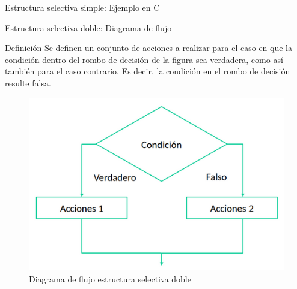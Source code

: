 \documentclass[xcolor=pdftex,table,11pt]{beamer}
\begin{document}
\begin{frame}{Estructura selectiva simple: Ejemplo en C}
\codesetstylefrombeamer
{}
\end{frame}



\begin{frame}{Estructura selectiva doble: Diagrama de flujo}
\begin{block}{Definición}
Se definen un conjunto de acciones a realizar para el caso en que la condición dentro del rombo de decisión de la figura sea verdadera, como así también para el caso contrario. Es decir, la condición en el rombo de decisión resulte falsa.
\end{block}


 \begin{figure}
 \centering
\includegraphics[scale=0.3]{../img/exported/if_else.png}
\caption{Diagrama de flujo estructura selectiva doble}
\end{figure}

\end{frame}
\end{document}
